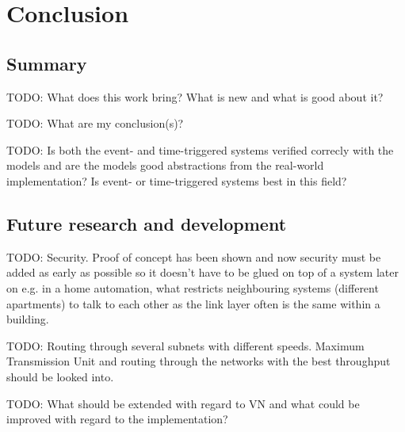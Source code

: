 \chapter{Conclusion}\label{ch:conclusion}
\section{Summary}
TODO: What does this work bring? What is new and what is good about it?

TODO: What are my conclusion(s)?

TODO: Is both the event- and time-triggered systems verified correcly with the
models and are the models good abstractions from the real-world implementation?
Is event- or time-triggered systems best in this field?

\section{Future research and development}
TODO: Security. Proof of concept has been shown and now security must be added
as early as possible so it doesn't have to be glued on top of a system later on
e.g. in a home automation, what restricts neighbouring systems (different
apartments) to talk to each other as the link layer often is the same within a
building.

TODO: Routing through several subnets with different speeds. Maximum
Transmission Unit and routing through the networks with the best throughput
should be looked into.

TODO: What should be extended with regard to VN and what could be improved with
regard to the implementation?

